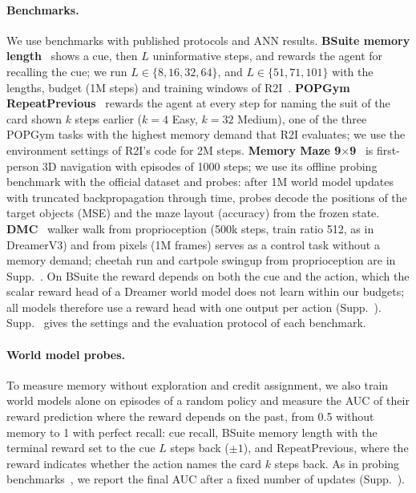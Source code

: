 \paragraph{Benchmarks.}
We use benchmarks with published protocols and ANN results.
\textbf{BSuite memory length}~\cite{osband2020bsuite} shows a cue, then $L$ uninformative steps, and rewards the agent for recalling the cue; we run $L\in\{8,16,32,64\}$, and $L\in\{51,71,101\}$ with the lengths, budget (1M steps) and training windows of R2I~\cite{samsami2024r2i}.
\textbf{POPGym RepeatPrevious}~\cite{morad2023popgym} rewards the agent at every step for naming the suit of the card shown $k$ steps earlier ($k=4$ Easy, $k=32$ Medium), one of the three POPGym tasks with the highest memory demand that R2I evaluates; we use the environment settings of R2I's code for 2M steps.
\textbf{Memory Maze 9$\times$9}~\cite{pasukonis2023memorymaze} is first-person 3D navigation with episodes of 1000 steps; we use its offline probing benchmark with the official dataset and probes: after 1M world model updates with truncated backpropagation through time, probes decode the positions of the target objects (MSE) and the maze layout (accuracy) from the frozen state.
\textbf{DMC}~\cite{tassa2018dmc} walker walk from proprioception (500k steps, train ratio 512, as in DreamerV3) and from pixels (1M frames) serves as a control task without a memory demand; cheetah run and cartpole swingup from proprioception are in Supp.~.
On BSuite the reward depends on both the cue and the action, which the scalar reward head of a Dreamer world model does not learn within our budgets; all models therefore use a reward head with one output per action (Supp.~).
Supp.~ gives the settings and the evaluation protocol of each benchmark.

\paragraph{World model probes.}
To measure memory without exploration and credit assignment, we also train world models alone on episodes of a random policy and measure the AUC of their reward prediction where the reward depends on the past, from 0.5 without memory to 1 with perfect recall: cue recall, BSuite memory length with the terminal reward set to the cue $L$ steps back ($\pm1$), and RepeatPrevious, where the reward indicates whether the action names the card $k$ steps back.
As in probing benchmarks~\cite{pasukonis2023memorymaze}, we report the final AUC after a fixed number of updates (Supp.~).

